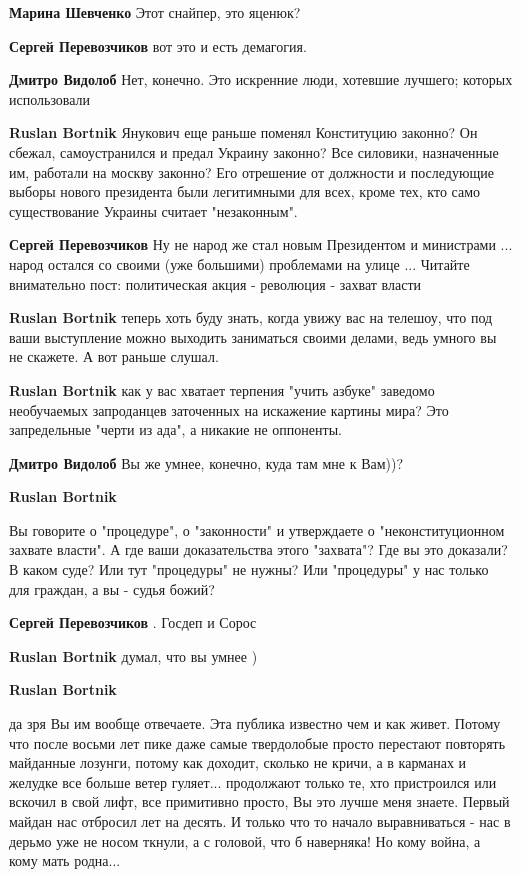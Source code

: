 \begin{itemize}
\begin{itemize}
\textbf{Марина Шевченко} Этот снайпер, это яценюк?

\textbf{Сергей Перевозчиков} вот это и есть демагогия.

\textbf{Дмитро Видолоб} Нет, конечно. Это искренние люди, хотевшие лучшего; которых использовали

\textbf{Ruslan Bortnik} Янукович еще раньше поменял Конституцию законно? Он сбежал, самоустранился и предал Украину законно? Все силовики, назначенные им, работали на москву законно? Его отрешение от должности и последующие выборы нового президента были легитимными для всех, кроме тех, кто само существование Украины считает "незаконным".

\textbf{Сергей Перевозчиков} Ну не народ же стал новым Президентом и министрами ... народ остался со своими (уже большими) проблемами на улице ... Читайте внимательно пост: политическая акция - революция - захват власти

\textbf{Ruslan Bortnik} теперь хоть буду знать, когда увижу вас на телешоу, что под ваши выступление можно выходить заниматься своими делами, ведь умного вы не скажете. А вот раньше слушал.

\textbf{Ruslan Bortnik} как у вас хватает терпения "учить азбуке" заведомо необучаемых запроданцев заточенных на искажение картины мира? Это запредельные "черти из ада", а никакие не оппоненты.

\textbf{Дмитро Видолоб} Вы же умнее, конечно, куда там мне к Вам))?

\textbf{Ruslan Bortnik} 

Вы говорите о "процедуре", о "законности" и утверждаете о "неконституционном
захвате власти". А где ваши доказательства этого "захвата"? Где вы это
доказали? В каком суде? Или тут "процедуры" не нужны? Или "процедуры" у нас
только для граждан, а вы - судья божий?

\textbf{Сергей Перевозчиков} . Госдеп и Сорос

\textbf{Ruslan Bortnik} думал, что вы умнее )

\textbf{Ruslan Bortnik} 

да зря Вы им вообще отвечаете. Эта публика известно чем и как живет. Потому что
после восьми лет пике даже самые твердолобые просто перестают повторять
майданные лозунги, потому как доходит, сколько не кричи, а в карманах и желудке
все больше ветер гуляет... продолжают только те, хто пристроился или вскочил в
свой лифт, все примитивно просто, Вы это лучше меня знаете. Первый майдан нас
отбросил лет на десять. И только что то начало выравниваться - нас в дерьмо уже
не носом ткнули, а с головой, что б наверняка! Но кому война, а кому мать
родна...


\end{itemize}
\end{itemize}
